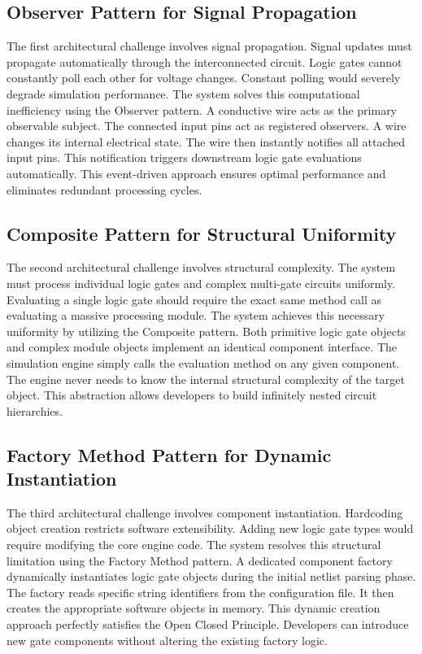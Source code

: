\documentclass[12pt, a4paper]{article}
\begin{document}
\subsection{Observer Pattern for Signal Propagation}
The first architectural challenge involves signal propagation. Signal updates must propagate automatically through the interconnected circuit. Logic gates cannot constantly poll each other for voltage changes. Constant polling would severely degrade simulation performance. The system solves this computational inefficiency using the Observer pattern. A conductive wire acts as the primary observable subject. The connected input pins act as registered observers. A wire changes its internal electrical state. The wire then instantly notifies all attached input pins. This notification triggers downstream logic gate evaluations automatically. This event-driven approach ensures optimal performance and eliminates redundant processing cycles.

\subsection{Composite Pattern for Structural Uniformity}
The second architectural challenge involves structural complexity. The system must process individual logic gates and complex multi-gate circuits uniformly. Evaluating a single logic gate should require the exact same method call as evaluating a massive processing module. The system achieves this necessary uniformity by utilizing the Composite pattern. Both primitive logic gate objects and complex module objects implement an identical component interface. The simulation engine simply calls the evaluation method on any given component. The engine never needs to know the internal structural complexity of the target object. This abstraction allows developers to build infinitely nested circuit hierarchies.

\subsection{Factory Method Pattern for Dynamic Instantiation}
The third architectural challenge involves component instantiation. Hardcoding object creation restricts software extensibility. Adding new logic gate types would require modifying the core engine code. The system resolves this structural limitation using the Factory Method pattern. A dedicated component factory dynamically instantiates logic gate objects during the initial netlist parsing phase. The factory reads specific string identifiers from the configuration file. It then creates the appropriate software objects in memory. This dynamic creation approach perfectly satisfies the Open Closed Principle. Developers can introduce new gate components without altering the existing factory logic.
\end{document}

